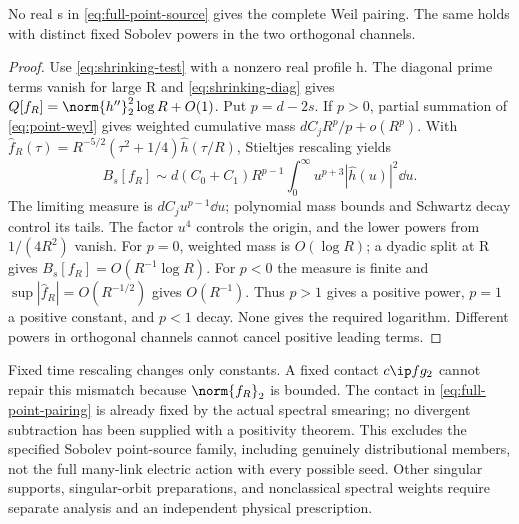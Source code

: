 \begin{proposition}\label{prop:point-exclusion}
No real s in \eqref{eq:full-point-source} gives the complete Weil
pairing. The same holds with distinct fixed Sobolev powers in the
two orthogonal channels.
\end{proposition}
\begin{proof}
Use \eqref{eq:shrinking-test} with a nonzero real profile h.
The diagonal prime terms vanish for large R and
\eqref{eq:shrinking-diag} gives
$Q[f_R]=\norm{h''}_2^2\log R+O(1)$.
Put $p=d-2s$. If $p>0$, partial summation of
\eqref{eq:point-weyl} gives weighted cumulative mass
$dC_jR^p/p+o(R^p)$. With
$\widehat f_R(\tau)=R^{-5/2}(\tau^2+1/4)\widehat h(\tau/R)$,
Stieltjes rescaling yields
\begin{equation}\label{eq:point-scaling}
B_s[f_R]\sim d(C_0+C_1)R^{p-1}
\int_0^\infty u^{p+3}|\widehat h(u)|^2\dd u.
\end{equation}
The limiting measure is $dC_ju^{p-1}\dd u$; polynomial mass
bounds and Schwartz decay control its tails. The factor $u^4$
controls the origin, and the lower powers from $1/(4R^2)$ vanish.
For $p=0$, weighted mass is $O(\log R)$; a dyadic split at R
gives $B_s[f_R]=O(R^{-1}\log R)$. For $p<0$ the measure is finite
and $\sup|\widehat f_R|=O(R^{-1/2})$ gives $O(R^{-1})$.
Thus $p>1$ gives a positive power, $p=1$ a positive constant,
and $p<1$ decay. None gives the required logarithm. Different
powers in orthogonal channels cannot cancel positive leading terms.
\end{proof}
Fixed time rescaling changes only constants. A fixed contact
$c\ip f g_2$ cannot repair this mismatch because $\norm{f_R}_2$
is bounded. The contact in \eqref{eq:full-point-pairing} is already
fixed by the actual spectral smearing; no divergent subtraction has
been supplied with a positivity theorem. This excludes the specified
Sobolev point-source family, including genuinely distributional
members, not the full many-link electric action with every possible
seed. Other singular supports, singular-orbit preparations, and
nonclassical spectral weights require separate analysis and an
independent physical prescription.

